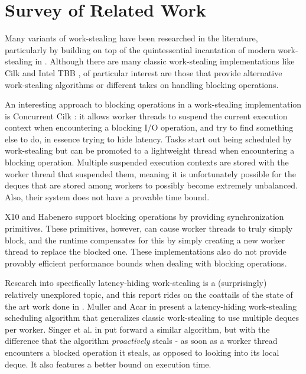 \documentclass[bsc,frontabs,singlespacing,parskip,deptreport,normalheadings]{infthesis}
\begin{document}
\section{Survey of Related Work}
\label{section:survey_of_related_work}

Many variants of work-stealing have been researched in the literature,
particularly by building on top of the quintessential incantation of modern
work-stealing in \cite{arora_thread_1998}. Although there are many classic
work-stealing implementations like Cilk \cite{frigo_implementation_1998} and Intel
TBB \cite{noauthor_advanced_nodate}, of particular interest are those that
provide alternative work-stealing algorithms or different takes on handling
blocking operations.

An interesting approach to blocking operations in a work-stealing implementation
is Concurrent Cilk \cite{zakian_concurrent_2016}: it allows worker threads to
suspend the current execution context when encountering a blocking I/O
operation, and try to find something else to do, in essence trying to hide
latency. Tasks start out being scheduled by work-stealing but can be promoted to
a lightweight thread when encountering a blocking operation. Multiple suspended
execution contexts are stored with the worker thread that suspended them,
meaning it is unfortunately possible for the deques that are stored among
workers to possibly become extremely unbalanced. Also, their system does not
have a provable time bound.

X10 \cite{charles_x10_2005} and Habenero \cite{cave_habanero-java_2011} support
blocking operations by providing synchronization primitives. These primitives,
however, can cause worker threads to truly simply block, and the runtime
compensates for this by simply creating a new worker thread to replace the
blocked one. These implementations also do not provide provably efficient
performance bounds when dealing with blocking operations.

Research into specifically latency-hiding work-stealing is a (surprisingly)
relatively unexplored topic, and this report rides on the coattails of the state
of the art work done in \cite{muller_latency-hiding_2016,
singer_proactive_2019}. Muller and Acar in \cite{muller_latency-hiding_2016}
present a latency-hiding work-stealing scheduling algorithm that generalizes
classic work-stealing to use multiple deques per worker. Singer et al. in
\cite{singer_proactive_2019} put forward a similar algorithm, but with the
difference that the algorithm \textit{proactively} steals - as soon as a worker
thread encounters a blocked operation it steals, as opposed to looking into its
local deque. It also features a better bound on execution time.
\end{document}
